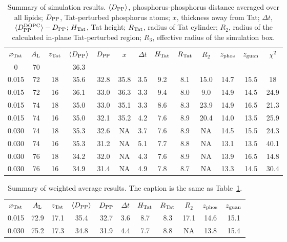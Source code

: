 \begin{table}
  \centering
  \begin{tabular}{c c c c c c c c c c c c c}
    $x_\textrm{Tat}$ & $A_\textrm{L}$ & $z_\textrm{Tat}$ & $\langle D_\textrm{PP}\rangle$ & $D_\textrm{PP}$ & $x$ & $\Delta t$ & $H_\textrm{Tat}$ & $R_\textrm{Tat}$ & $R_2$ & $z_\textrm{phos}$ & $z_\textrm{guan}$ & $\chi^2$ \\
    0 & 70 & & 36.3 & & & \\
    0.015 & 72 & 18 & 35.6 & 32.8 & 35.8 & 3.5 & 9.2 & 8.1 & 15.0 & 14.7 & 15.5 & 18 \\ 
    0.015 & 72 & 16 & 36.1 & 33.0 & 36.3 & 3.3 & 9.4 & 8.0 & 9.0  & 14.9 & 14.5 & 24.9 \\
    0.015 & 74 & 18 & 35.0 & 33.0 & 35.1 & 3.3 & 8.6 & 8.3 & 23.9 & 14.9 & 16.5 & 21.3 \\
    0.015 & 74 & 16 & 35.0 & 32.1 & 35.2 & 4.2 & 7.6 & 8.9 & 20.4 & 14.0 & 13.5 & 25.9 \\
    0.030 & 74 & 18 & 35.3 & 32.6 & NA   & 3.7 & 7.6 & 8.9 & NA   & 14.5 & 15.5 & 24.3 \\ 
    0.030 & 74 & 16 & 35.3 & 31.2 & NA   & 5.1 & 7.7 & 8.8 & NA   & 13.1 & 13.5 & 40.1 \\
    0.030 & 76 & 18 & 34.2 & 32.0 & NA   & 4.3 & 7.6 & 8.9 & NA   & 13.9 & 16.5 & 14.8 \\
    0.030 & 76 & 16 & 34.9 & 31.4 & NA   & 4.9 & 7.8 & 8.7 & NA   & 13.3 & 14.5 & 30.4
  \end{tabular}
  \caption{Summary of simulation results. $\langle D_\textrm{PP}\rangle$, phosphorus-phosphorus 
  distance averaged over all lipids; $D_\textrm{PP}$, Tat-perturbed phosphorus atoms; 
  $x$, thickness away from Tat; $\Delta t$, $\langle D_\textrm{PP}^\textrm{DOPC}\rangle-D_\textrm{PP}$; $H_\textrm{Tat}$, Tat 
  height; $R_\textrm{Tat}$, radius of Tat cylinder; $R_2$, radius of the calculated
  in-plane Tat-perturbed region; $R_3$, effective radius of the simulation box.}
  \label{tab:MD_summary}
\end{table}

\begin{table}
  \centering
  \begin{tabular}{c c c c c c c c c c c}
    $x_\textrm{Tat}$ & $A_\textrm{L}$ & $z_\textrm{Tat}$ & $\langle D_\textrm{PP}\rangle$ & $D_\textrm{PP}$ & $\Delta t$ & $H_\textrm{Tat}$ & $R_\textrm{Tat}$ & $R_2$ & $z_\textrm{phos}$ & $z_\textrm{guan}$ \\
    0.015 & 72.9 & 17.1 & 35.4 & 32.7 & 3.6 & 8.7 & 8.3 & 17.1 & 14.6 & 15.1 \\  
    0.030 & 75.2 & 17.3 & 34.8 & 31.9 & 4.4 & 7.7 & 8.8 & NA & 13.8 & 15.4
  \end{tabular}
  \caption{Summary of weighted average results. The caption is the same as
  Table~\ref{tab:MD_summary}.}
  \label{tab:MD_summary_avg}
\end{table}

